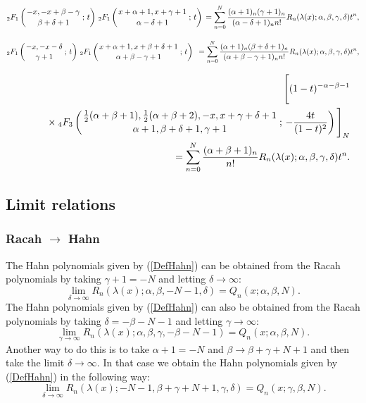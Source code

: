 \documentclass[envcountchap,graybox]{svmono}
\newcounter{rom}
\newcommand{\hyp}[5]{\mbox{}_{#1}{F}_{#2}
\left(\genfrac{}{}{0pt}{}{#3}{#4}\,;\,#5\right)}
\newcommand{\mathindent}{\hspace{7.5mm}}
\newcommand{\hyp}[5]{\,\mbox{}_{#1}F_{#2}\!\left(
  \genfrac{}{}{0pt}{}{#3}{#4};#5\right)}
\begin{document}
\begin{eqnarray}
\label{GenRacah2}
\hyp{2}{1}{-x,-x+\beta-\gamma}{\beta+\delta+1}{t}\,\hyp{2}{1}{x+\alpha+1,x+\gamma+1}{\alpha-\delta+1}{t}
{}=\sum_{n=0}^N\frac{(\alpha+1)_n(\gamma+1)_n}{(\alpha-\delta+1)_nn!}
R_n(\lambda(x);\alpha,\beta,\gamma,\delta)t^n,
\end{eqnarray}

\begin{eqnarray}
\label{GenRacah3}
\hyp{2}{1}{-x,-x-\delta}{\gamma+1}{t}\,\hyp{2}{1}{x+\alpha+1,x+\beta+\delta+1}{\alpha+\beta-\gamma+1}{t}\
{}=\sum_{n=0}^N\frac{(\alpha+1)_n(\beta+\delta+1)_n}{(\alpha+\beta-\gamma+1)_nn!}
R_n(\lambda(x);\alpha,\beta,\gamma,\delta)t^n,
\end{eqnarray}

\begin{eqnarray}
\label{GenRacah4}
& &\Bigg[(1-t)^{-\alpha-\beta-1}\nonumber\\
& &{}\mathindent\times\hyp{4}{3}{\frac{1}{2}(\alpha+\beta+1),\frac{1}{2}(\alpha+\beta+2),-x,x+\gamma+\delta+1}
{\alpha+1,\beta+\delta+1,\gamma+1}{-\frac{4t}{(1-t)^2}}\Bigg]_N\nonumber\\
& &{}=\sum_{n=0}^N\frac{(\alpha+\beta+1)_n}{n!}R_n(\lambda(x);\alpha,\beta,\gamma,\delta)t^n.
\end{eqnarray}

\subsection*{Limit relations}

\subsubsection*{Racah $\rightarrow$ Hahn}
The Hahn polynomials given by (\ref{DefHahn}) can be obtained from the Racah polynomials
by taking $\gamma+1=-N$ and letting $\delta\rightarrow\infty$:
\begin{equation}
\lim_{\delta\rightarrow\infty}
R_n(\lambda(x);\alpha,\beta,-N-1,\delta)=Q_n(x;\alpha,\beta,N).
\end{equation}
The Hahn polynomials given by (\ref{DefHahn}) can also be obtained from the Racah polynomials
by taking $\delta=-\beta-N-1$ and letting $\gamma\rightarrow\infty$:
\begin{equation}
\lim_{\gamma\rightarrow\infty}
R_n(\lambda(x);\alpha,\beta,\gamma,-\beta-N-1)=Q_n(x;\alpha,\beta,N).
\end{equation}
Another way to do this is to take $\alpha+1=-N$ and $\beta\rightarrow\beta+\gamma+N+1$ and then
take the limit $\delta\rightarrow\infty$. In that case we obtain the Hahn polynomials given by
(\ref{DefHahn}) in the following way:
\begin{equation}
\lim_{\delta\rightarrow\infty}
R_n(\lambda(x);-N-1,\beta+\gamma+N+1,\gamma,\delta)=Q_n(x;\gamma,\beta,N).
\end{equation}
\end{document}

